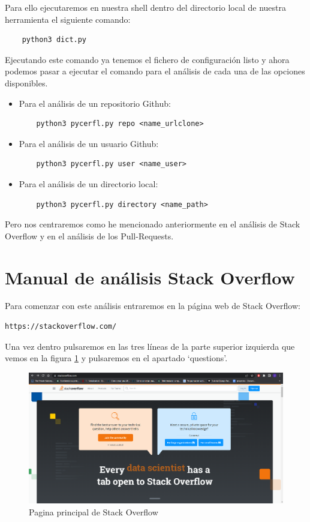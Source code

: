 \documentclass[a4paper, 12pt]{book}
\begin{document}
Para ello ejecutaremos en nuestra shell dentro del directorio local de nuestra herramienta el siguiente comando:

\begin{verbatim}
	python3 dict.py
\end{verbatim}

Ejecutando este comando ya tenemos el fichero de configuración listo y ahora podemos pasar a ejecutar el comando para el análisis de cada una de las opciones disponibles.

\begin{itemize}
	\item Para el análisis de un repositorio Github:
	\begin{verbatim}
	python3 pycerfl.py repo <name_urlclone>
	\end{verbatim}
	\item Para el análisis de un usuario Github:
	\begin{verbatim}
	python3 pycerfl.py user <name_user>
	\end{verbatim}
	\item Para el análisis de un directorio local:
	\begin{verbatim}
	python3 pycerfl.py directory <name_path>
	\end{verbatim}
\end{itemize}

Pero nos centraremos como he mencionado anteriormente en el análisis de Stack Overflow y en el análisis de los Pull-Requests.

\section{Manual de análisis Stack Overflow}

Para comenzar con este análisis entraremos en la página web de Stack Overflow:

\begin{verbatim}
https://stackoverflow.com/
\end{verbatim}

Una vez dentro pulsaremos en las tres líneas de la parte superior izquierda que vemos en la figura \ref{figura:stack1} y pulsaremos en el apartado `questions'.

\begin{figure}
    \includegraphics[bb=0 0 800 600, width=12cm, keepaspectratio]{img/stack1}
    \caption{Pagina principal de Stack Overflow}
    \label{figura:stack1}
 \end{figure}
 
\end{document}
